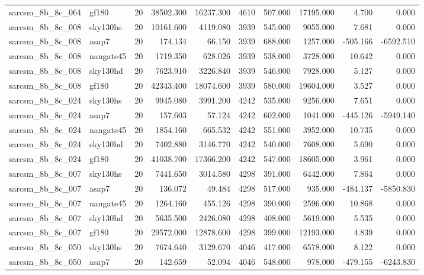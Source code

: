 \begin{tabular}{llrrrrrrrr}
sarcsm\_8b\_8c\_064 & gf180 & 20 & 38502.300 & 16237.300 & 4610 & 507.000 & 17195.000 & 4.700 & 0.000 \\
sarcsm\_8b\_8c\_008 & sky130hs & 20 & 10161.600 & 4119.080 & 3939 & 545.000 & 9055.000 & 7.681 & 0.000 \\
sarcsm\_8b\_8c\_008 & asap7 & 20 & 174.134 & 66.150 & 3939 & 688.000 & 1257.000 & -505.166 & -6592.510 \\
sarcsm\_8b\_8c\_008 & nangate45 & 20 & 1719.350 & 628.026 & 3939 & 538.000 & 3728.000 & 10.642 & 0.000 \\
sarcsm\_8b\_8c\_008 & sky130hd & 20 & 7623.910 & 3226.840 & 3939 & 546.000 & 7928.000 & 5.127 & 0.000 \\
sarcsm\_8b\_8c\_008 & gf180 & 20 & 42343.400 & 18074.600 & 3939 & 580.000 & 19604.000 & 3.527 & 0.000 \\
sarcsm\_8b\_8c\_024 & sky130hs & 20 & 9945.080 & 3991.200 & 4242 & 535.000 & 9256.000 & 7.651 & 0.000 \\
sarcsm\_8b\_8c\_024 & asap7 & 20 & 157.603 & 57.124 & 4242 & 602.000 & 1041.000 & -445.126 & -5949.140 \\
sarcsm\_8b\_8c\_024 & nangate45 & 20 & 1854.160 & 665.532 & 4242 & 551.000 & 3952.000 & 10.735 & 0.000 \\
sarcsm\_8b\_8c\_024 & sky130hd & 20 & 7402.880 & 3146.770 & 4242 & 540.000 & 7608.000 & 5.690 & 0.000 \\
sarcsm\_8b\_8c\_024 & gf180 & 20 & 41038.700 & 17366.200 & 4242 & 547.000 & 18605.000 & 3.961 & 0.000 \\
sarcsm\_8b\_8c\_007 & sky130hs & 20 & 7441.650 & 3014.580 & 4298 & 391.000 & 6442.000 & 7.864 & 0.000 \\
sarcsm\_8b\_8c\_007 & asap7 & 20 & 136.072 & 49.484 & 4298 & 517.000 & 935.000 & -484.137 & -5850.830 \\
sarcsm\_8b\_8c\_007 & nangate45 & 20 & 1264.160 & 455.126 & 4298 & 390.000 & 2596.000 & 10.868 & 0.000 \\
sarcsm\_8b\_8c\_007 & sky130hd & 20 & 5635.500 & 2426.080 & 4298 & 408.000 & 5619.000 & 5.535 & 0.000 \\
sarcsm\_8b\_8c\_007 & gf180 & 20 & 29572.000 & 12878.600 & 4298 & 399.000 & 12193.000 & 4.839 & 0.000 \\
sarcsm\_8b\_8c\_050 & sky130hs & 20 & 7674.640 & 3129.670 & 4046 & 417.000 & 6578.000 & 8.122 & 0.000 \\
sarcsm\_8b\_8c\_050 & asap7 & 20 & 142.659 & 52.094 & 4046 & 548.000 & 978.000 & -479.155 & -6243.830 \\

\end{tabular}
